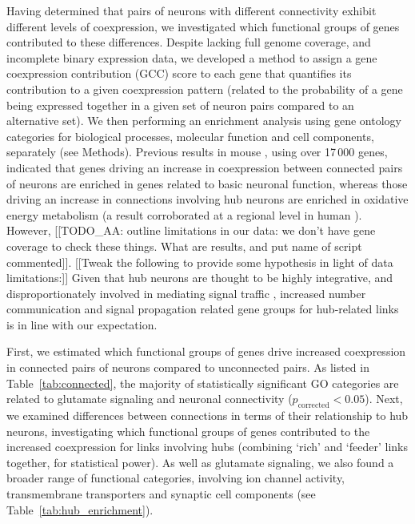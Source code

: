 \documentclass[10pt,letterpaper]{article}
\begin{document}

Having determined that pairs of neurons with different connectivity exhibit different levels of coexpression, we investigated which functional groups of genes contributed to these differences.
Despite lacking full genome coverage, and incomplete binary expression data, we developed a method to assign a gene coexpression contribution (GCC) score to each gene that quantifies its contribution to a given coexpression pattern (related to the probability of a gene being expressed together in a given set of neuron pairs compared to an alternative set).
We then performing an enrichment analysis using gene ontology categories for biological processes, molecular function and cell components, separately (see Methods).
Previous results in mouse \cite{Fulcher:2016ck}, using over 17\,000 genes, indicated that genes driving an increase in coexpression between connected pairs of neurons are enriched in genes related to basic neuronal function, whereas those driving an increase in connections involving hub neurons are enriched in oxidative energy metabolism (a result corroborated at a regional level in human \cite{Vertes2016a}).
However, [[TODO_AA: outline limitations in our data: we don't have gene coverage to check these things. What are results, and put name of script commented]].
[[Tweak the following to provide some hypothesis in light of data limitations:]]
Given that hub neurons are thought to be highly integrative, and disproportionately involved in mediating signal traffic \cite{Towlson:2013gf}, increased number communication and signal propagation related gene groups for hub-related links is in line with our expectation.

First, we estimated which functional groups of genes drive increased coexpression in connected pairs of neurons compared to unconnected pairs.
As listed in Table~\ref{tab:connected}, the majority of statistically significant GO categories are related to glutamate signaling and neuronal connectivity ($p_\mathrm{corrected} < 0.05$).
Next, we examined differences between connections in terms of their relationship to hub neurons, investigating which functional groups of genes contributed to the increased coexpression for links involving hubs (combining `rich' and `feeder' links together, for statistical power).
As well as glutamate signaling, we also found a broader range of functional categories, involving  ion channel activity, transmembrane transporters and synaptic cell components (see Table~\ref{tab:hub_enrichment}).
\end{document}
